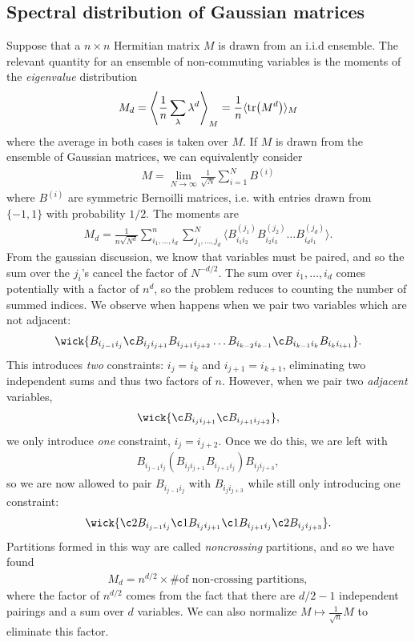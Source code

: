 \documentclass[11pt]{article}
\theoremstyle{definition}
\begin{document}
\subsection{Spectral distribution of Gaussian matrices}
Suppose that a $n\times n$ Hermitian matrix $M$ is drawn from an i.i.d ensemble. The relevant quantity for an ensemble of non-commuting variables is the moments of the \emph{eigenvalue} distribution
\begin{align}
M_d = \left\langle\frac{1}{n}\sum_{\lambda}\lambda^d\right\rangle_M = \frac{1}{n}\langle \tr(M^d) \rangle_M
\end{align}
where the average in both cases is taken over $M$. If $M$ is drawn from the ensemble of Gaussian matrices, we can equivalently consider
\begin{align}
M = \lim_{N \to \infty}\frac{1}{\sqrt{N}}\sum_{i=1}^N B^{(i)}
\end{align}
where $B^{(i)}$ are symmetric Bernoilli matrices, i.e. with entries drawn from $\{-1,1\}$ with probability $1/2$. The moments are
\begin{align}
M_d = \frac{1}{n\sqrt{N^d}}\sum_{i_1, \ldots, i_d}^n\sum_{j_1,\ldots, j_d}^N \langle B^{(j_1)}_{i_1i_2} B^{(j_2)}_{i_2i_3} \ldots B^{(j_d)}_{i_di_1}\rangle.
\end{align}
From the gaussian discussion, we know that variables must be paired, and so the sum over the $j_i$'s cancel the factor of $N^{-d/2}$. 
The sum over $i_1, \ldots, i_d$ comes potentially with a factor of $n^d$, so the problem reduces to counting the number of summed indices. We observe when happens when we pair two variables which are not adjacent:
\begin{align}
\wick{B_{i_{j-1}i_{j}}\c B_{i_ji_{j+1}}B_{i_{j+1}i_{j+2}} \ldots B_{i_{k-2}i_{k-1}}\c B_{i_{k-1}i_{k}}B_{i_ki_{i+1}}}.
\end{align}
This introduces \emph{two} constraints: $i_j = i_k$ and $i_{j+1} = i_{k+1}$, eliminating two independent sums and thus two factors of $n$. However, when we pair two \emph{adjacent} variables,
\begin{align}
\wick{\c B_{i_j i_{j+1}}\c B_{i_{j+1}i_{j+2}}},
\end{align}
we only introduce \emph{one} constraint, $i_j = i_{j+2}$. Once we do this, we are left with
\begin{align}
B_{i_{j-1}i_{j}}(B_{i_j i_{j+1}}B_{i_{j+1}i_j})B_{i_j i_{j+3}},
\end{align}
so we are now allowed to pair $B_{i_{j-1}i_j}$ with $B_{i_j i_{j+3}}$ while still only introducing one constraint:
\begin{align}
\wick{\c2 B_{i_{j-1}i_{j}}\c1 B_{i_j i_{j+1}}\c1 B_{i_{j+1}i_j} \c2 B_{i_j i_{j+3}}}.
\end{align}
Partitions formed in this way are called \emph{noncrossing} partitions, and so we have found
\begin{align}
M_d = n^{d/2} \times \text{\# of non-crossing partitions},
\end{align}
where the factor of $n^{d/2}$ comes from the fact that there are $d/2-1$ independent pairings and a sum over $d$ variables.
We can also normalize $M \mapsto \frac{1}{\sqrt{n}}M$ to eliminate this factor.
\end{document}
